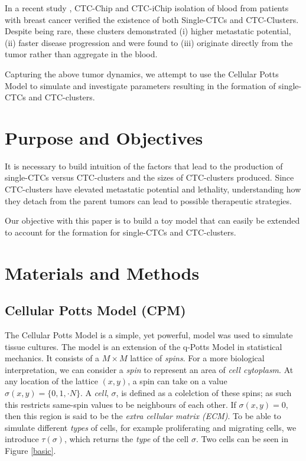 \documentclass[12pt]{article}
\begin{document}
In a recent study \cite{Aceto2014}, CTC-Chip and CTC-iChip isolation of blood from patients with breast cancer verified the existence of both Single-CTCs and CTC-Clusters. Despite being rare, these clusters demonstrated (i) higher metastatic potential, (ii) faster disease progression and were found to (iii) originate directly from the tumor rather than aggregate in the blood.

Capturing the above tumor dynamics, we attempt to use the Cellular Potts Model to simulate and investigate parameters resulting in the formation of single-CTCs and CTC-clusters.

\section{Purpose and Objectives}
It is necessary to build intuition of the factors that lead to the production of single-CTCs versus CTC-clusters and the sizes of CTC-clusters produced. Since CTC-clusters have elevated metastatic potential and lethality, understanding how they detach from the parent tumors can lead to possible therapeutic strategies.

Our objective with this paper is to build a toy model that can easily be extended to account for the formation for single-CTCs and CTC-clusters.

\section{Materials and Methods}
\subsection{Cellular Potts Model (CPM)}
The Cellular Potts Model \cite{Graner1992} is a simple, yet powerful, model was used to simulate tissue cultures.  The model is an extension of the q-Potts Model in statistical mechanics. It consists of a $M\times M$ lattice of \emph{spins}. For a more biological interpretation, we can consider a \emph{spin} to represent an area of \emph{cell cytoplasm}. At any location of the lattice $(x,y)$, a spin can take on a value $\sigma(x,y) = \{0,1,\cdot N\}$. A \emph{cell}, $\sigma$, is defined as a colelction of these spins; as such this restricts same-spin values to be neighbours of each other. If $\sigma(x,y) = 0$, then this region is said to be the \emph{extra cellular matrix (ECM)}. To be able to simulate different \emph{types} of cells, for example proliferating and migrating cells, we introduce $\tau(\sigma)$, which returns the \emph{type} of the cell $\sigma$. Two cells can be seen in Figure \ref{basic}.
\end{document}
